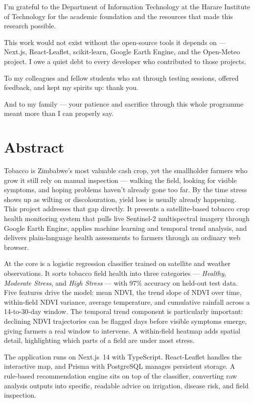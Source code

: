 \documentclass[12pt,a4paper]{report}
\begin{document}
I'm grateful to the Department of Information Technology at the Harare Institute of Technology for the academic foundation and the resources that made this research possible.

This work would not exist without the open-source tools it depends on — Next.js, React-Leaflet, scikit-learn, Google Earth Engine, and the Open-Meteo project. I owe a quiet debt to every developer who contributed to those projects.

To my colleagues and fellow students who sat through testing sessions, offered feedback, and kept my spirits up: thank you.

And to my family — your patience and sacrifice through this whole programme meant more than I can properly say.

\chapter*{Abstract}

Tobacco is Zimbabwe's most valuable cash crop, yet the smallholder farmers who grow it still rely on manual inspection — walking the field, looking for visible symptoms, and hoping problems haven't already gone too far. By the time stress shows up as wilting or discolouration, yield loss is usually already happening. This project addresses that gap directly. It presents a satellite-based tobacco crop health monitoring system that pulls live Sentinel-2 multispectral imagery through Google Earth Engine, applies machine learning and temporal trend analysis, and delivers plain-language health assessments to farmers through an ordinary web browser.

At the core is a logistic regression classifier trained on satellite and weather observations. It sorts tobacco field health into three categories — \emph{Healthy}, \emph{Moderate Stress}, and \emph{High Stress} — with 97\% accuracy on held-out test data. Five features drive the model: mean NDVI, the trend slope of NDVI over time, within-field NDVI variance, average temperature, and cumulative rainfall across a 14-to-30-day window. The temporal trend component is particularly important: declining NDVI trajectories can be flagged days before visible symptoms emerge, giving farmers a real window to intervene. A within-field heatmap adds spatial detail, highlighting which parts of a field are under most stress.

The application runs on Next.js~14 with TypeScript. React-Leaflet handles the interactive map, and Prisma with PostgreSQL manages persistent storage. A rule-based recommendation engine sits on top of the classifier, converting raw analysis outputs into specific, readable advice on irrigation, disease risk, and field inspection.
\end{document}
